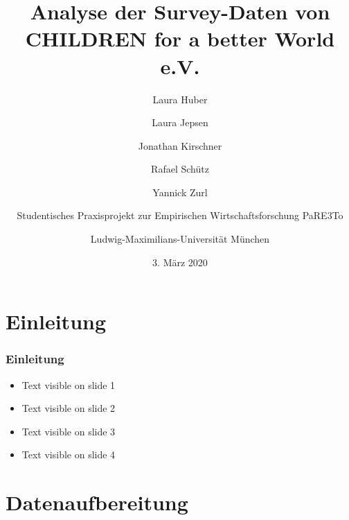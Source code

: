

%





\title[Analyse der Survey-Daten von CHILDREN]{Analyse der Survey-Daten von CHILDREN for a better World e.V.
	}
\author[Laura, Laura, Jonathan, Rafael und Yannick]{
Laura Huber\\
\and
Laura Jepsen\\
\and
Jonathan Kirschner\\
\and
Rafael Schütz\\
\and
Yannick Zurl\\
\and
Studentisches Praxisprojekt zur Empirischen Wirtschaftsforschung PaRE3To\\
\and
Ludwig-Maximilians-Universität München}
\date{3. März 2020}


\begin{frame}
	\maketitle
\end{frame}



\section{Einleitung}

\begin{frame}[fragile]
\frametitle{Einleitung}

\begin{itemize}
 \item<1-> Text visible on slide 1
 \item<2-> Text visible on slide 2
 \item<3> Text visible on slide 3
 \item<4-> Text visible on slide 4
\end{itemize}

\end{frame}

\section{Datenaufbereitung}

